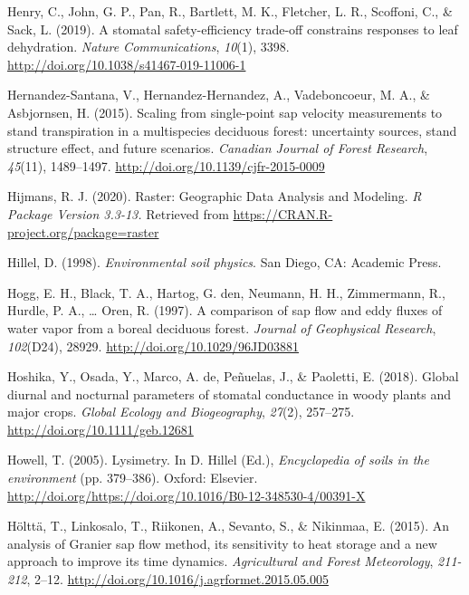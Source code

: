 \documentclass[11pt,twoside]{reedthesis}
\begin{document}
\hypertarget{ref-henry_stomatal_2019}{}
Henry, C., John, G. P., Pan, R., Bartlett, M. K., Fletcher, L. R.,
Scoffoni, C., \& Sack, L. (2019). A stomatal safety-efficiency trade-off
constrains responses to leaf dehydration. \emph{Nature Communications},
\emph{10}(1), 3398. \url{http://doi.org/10.1038/s41467-019-11006-1}

\hypertarget{ref-Hernandez-Santana2015}{}
Hernandez-Santana, V., Hernandez-Hernandez, A., Vadeboncoeur, M. A., \&
Asbjornsen, H. (2015). Scaling from single-point sap velocity
measurements to stand transpiration in a multispecies deciduous forest:
uncertainty sources, stand structure effect, and future scenarios.
\emph{Canadian Journal of Forest Research}, \emph{45}(11), 1489--1497.
\url{http://doi.org/10.1139/cjfr-2015-0009}

\hypertarget{ref-hijmans_raster_2020}{}
Hijmans, R. J. (2020). Raster: Geographic Data Analysis and Modeling.
\emph{R Package Version 3.3-13.} Retrieved from
\url{https://CRAN.R-project.org/package=raster}

\hypertarget{ref-hillel_environmental_1998}{}
Hillel, D. (1998). \emph{Environmental soil physics}. San Diego, CA:
Academic Press.

\hypertarget{ref-Hogg1997}{}
Hogg, E. H., Black, T. A., Hartog, G. den, Neumann, H. H., Zimmermann,
R., Hurdle, P. A., \ldots{} Oren, R. (1997). A comparison of sap flow
and eddy fluxes of water vapor from a boreal deciduous forest.
\emph{Journal of Geophysical Research}, \emph{102}(D24), 28929.
\url{http://doi.org/10.1029/96JD03881}

\hypertarget{ref-hoshika_global_2018}{}
Hoshika, Y., Osada, Y., Marco, A. de, Peñuelas, J., \& Paoletti, E.
(2018). Global diurnal and nocturnal parameters of stomatal conductance
in woody plants and major crops. \emph{Global Ecology and Biogeography},
\emph{27}(2), 257--275. \url{http://doi.org/10.1111/geb.12681}

\hypertarget{ref-Howell2005}{}
Howell, T. (2005). Lysimetry. In D. Hillel (Ed.), \emph{Encyclopedia of
soils in the environment} (pp. 379--386). Oxford: Elsevier.
\url{http://doi.org/https://doi.org/10.1016/B0-12-348530-4/00391-X}

\hypertarget{ref-Holtta2015}{}
Hölttä, T., Linkosalo, T., Riikonen, A., Sevanto, S., \& Nikinmaa, E.
(2015). An analysis of Granier sap flow method, its sensitivity to heat
storage and a new approach to improve its time dynamics.
\emph{Agricultural and Forest Meteorology}, \emph{211-212}, 2--12.
\url{http://doi.org/10.1016/j.agrformet.2015.05.005}
\end{document}
